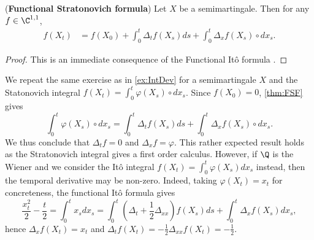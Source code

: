 \begin{theorem}\textnormal{(\textbf{Functional Stratonovich formula})}\label{thm:FSF} Let $X$ be a semimartingale. Then for any  $f\in \C^{1,1}$, 
\begin{align*}
    f(X_t) &= f(X_0) + \int_0^t \Delta_t f(X_s)  ds + \int_0^t\Delta_x f(X_s) \circ dx_s. 
\end{align*}
\end{theorem}
\begin{proof}
This is an immediate consequence of the Functional It\^o formula  \cite{Dupire}.
\end{proof}


\begin{example}\label{ex:StratDev}
We  repeat the same exercise as in \cref{ex:IntDev} for a semimartingale $X$ and the Statonovich integral $f(X_t) = \int_0^t \varphi(X_s) \circ dx_s$. Since $f(X_0)=0$,  \cref{thm:FSF} gives
$$\int_0^t \varphi(X_s) \circ dx_s =  \int_0^t \Delta_t f(X_s) ds + \int_0^t \Delta_x f(X_s) \circ dx_s.  $$
We thus conclude that $\Delta_t f =0$ and  $\Delta_x f =\varphi$. 
This rather expected result holds as the Stratonovich integral gives a first order calculus. 
However, if $\Q$ is the Wiener and we consider the It\^o integral $f(X_t) = \int_0^t \varphi(X_s)  dx_s$ instead, then the temporal derivative may be non-zero. Indeed, taking $\varphi(X_t)=x_t$ for concreteness, the functional It\^o formula gives 
$$\frac{x_t^2}{2} - \frac{t}{2}  = \int_0^t x_s dx_s =  \int_0^t (\Delta_t + \frac{1}{2}\Delta_{xx}) f(X_s) ds + \int_0^t \Delta_x f(X_s) dx_s,  $$
hence $\Delta_x f(X_t)= x_t$  and  $\Delta_t f(X_t) = -\frac{1}{2} \Delta_{xx} f(X_t) = -\frac{1}{2}$. 

\end{example}


